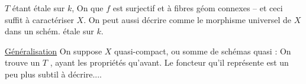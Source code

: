 $T$ étant étale sur $k$,  On  que $f$ est surjectif et à fibres géom connexes -- et ceci suffit à caractériser $X$. On peut aussi décrire comme le morphisme universel de $X$ dans un schém. étale sur $k$.


\uline{Généralisation} On suppose $X$ quasi-compact, ou somme de schémas quasi  : On trouve un $T$  , ayant les  propriétés\unsure{$\scriptscriptstyle\wedge$|,|$\scriptscriptstyle\times$} qu'avant. Le foncteur qu'il représente est un peu plus subtil à décrire....

